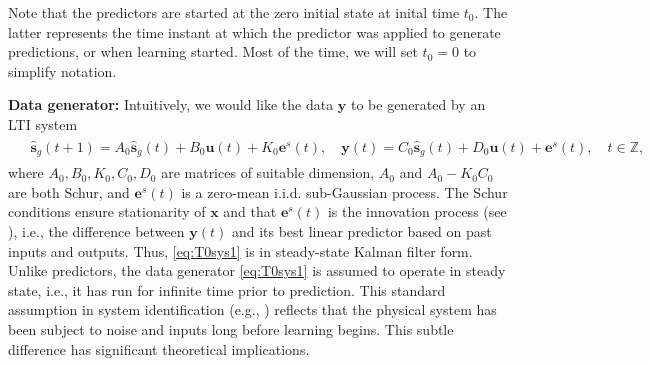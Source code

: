 \documentclass{article}
\def\rvu{{\mathbf{i}}}
\def\rvs{{\mathbf{s}}}
\def\rvu{{\mathbf{u}}}
\def\rvx{{\mathbf{x}}}
\def\rvy{{\mathbf{y}}}
\def\sR{{\mathbb{R}}}
\def\sZ{{\mathbb{Z}}}
\newcommand{\e}{\mathbf{e}}
\newcommand{\y}{\mathbf{y}}
\begin{document}
Note that the predictors are started at the zero initial state at inital time $t_0$. The latter represents the time instant at which the predictor was applied to generate predictions, or when learning started. Most of the time, we will set $t_0=0$ to simplify notation.

\textbf{Data generator:}
Intuitively, we would like %
the data  $\y$ to be generated by an LTI system %
\begin{align}
    \begin{split}
		&\hat{\rvs}_{g}(t+1)=A_0\hat{\rvs}_{g}(t)+B_0\rvu(t)+K_0\e^s(t), \quad \y(t) = C_0\hat{\rvs}_{g}(t)+D_0\rvu(t)+\e^s(t), \quad t \in \sZ,
    \end{split}     
		\label{eq:T0sys1}
\end{align}
where $A_0,B_0,K_0,C_0,D_0$ are matrices of suitable dimension, $A_0$ and $A_0-K_0C_0$ are both Schur, and $\e^s(t)$ is a zero-mean i.i.d. sub-Gaussian process. The Schur conditions ensure stationarity of $\rvx$ and that $\e^s(t)$ is the innovation process (see \cite[Chapter 4, p.~87]{LjungBook}), i.e., the difference between $\y(t)$ and its best linear predictor based on past inputs and outputs. Thus, \eqref{eq:T0sys1} is in steady-state Kalman filter form.
Unlike predictors, the data generator \eqref{eq:T0sys1} is assumed to operate in steady state, i.e., it has run for infinite time prior to prediction. This standard assumption in system identification (e.g., \cite{LjungBook}) reflects that the physical system has been subject to noise and inputs long before learning begins. This subtle difference has significant theoretical implications.
\end{document}
